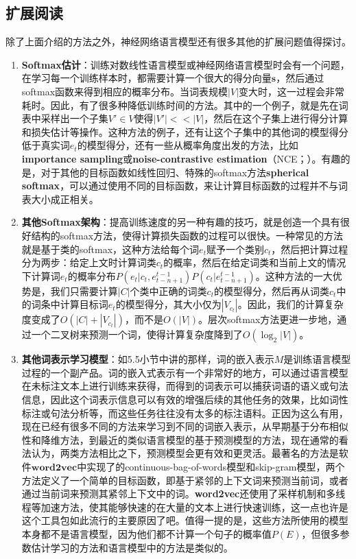 \documentclass[10pt,a4paper]{ctexart}
\begin{document}
\subsection{扩展阅读}
除了上面介绍的方法之外，神经网络语言模型还有很多其他的扩展问题值得探讨。
\begin{enumerate}
\item[] \textbf{Softmax估计}：训练对数线性语言模型或神经网络语言模型时会有一个问题，在学习每一个训练样本时，都需要计算一个很大的得分向量$\textbf{s}$，然后通过softmax函数来得到相应的概率分布。当词表规模$|V|$变大时，这一过程会非常耗时。因此，有了很多种降低训练时间的方法。其中的一个例子，就是先在词表中采样出一个子集$V' \in V$使得$|V'| << |V|$，然后在这个子集上进行得分计算和损失估计等操作。这种方法的例子，还有让这个子集中的其他词的模型得分低于真实词$e_t$的模型得分\cite{collobert2011natural}，还有一些从概率角度出发的方法，比如\textbf{importance sampling}\cite{bengio2008adaptive}或\textbf{noise-contrastive estimation}（NCE；\cite{mnih2012fast}）。有趣的是，对于其他的目标函数如线性回归、特殊的softmax方法\textbf{spherical softmax}，可以通过使用不同的目标函数，来让计算目标函数的过程并不与词表大小成正相关\cite{vincent2015efficient}。
\item[] \textbf{其他Softmax架构}：提高训练速度的另一种有趣的技巧，就是创造一个具有很好结构的softmax方法，使得计算损失函数的过程可以很快。一种常见的方法就是基于类的softmax\cite{goodman2001classes}，这种方法给每个词$e_t$赋予一个类别$c_t$，然后把计算过程分为两步：给定上文时计算词类$c_t$的概率，然后在给定词类和当前上文的情况下计算词$e_t$的概率分布$P(e_t|c_t,e_{t-n+1}^{t-1})P(c_t|e_{t-n+1}^{t-1})$。这种方法的一大优势是，我们只需要计算$|C|$个类中正确的词类$c_t$的模型得分，然后再从词类$c_t$中的词条中计算目标词$e_t$的模型得分，其大小仅为$|V_{c_t}|$。因此，我们的计算复杂度变成了$O(|C| + |V_{c_t}|)$，而不是$O(|V|)$。层次softmax方法\cite{mikolov2013distributed}更进一步地，通过一个二叉树来预测一个词，使得计算复杂度降到了$O(\log_2 |V|)$。
\item[] \textbf{其他词表示学习模型}：如5.5小节中讲的那样，词的嵌入表示$M$是训练语言模型过程的一个副产品。词的嵌入式表示有一个非常好的地方，可以通过语言模型在未标注文本上进行训练来获得，而得到的词表示可以捕获词语的语义或句法信息，因此这个词表示信息可以有效的增强后续的其他任务的效果，比如词性标注或句法分析等，而这些任务往往没有太多的标注语料\cite{turian2010word}。正因为这么有用，现在已经有很多不同的方法来学习到不同的词嵌入表示，从早期基于分布相似性和降维方法\cite{schutze1993word,turney2010frequency}，到最近的类似语言模型的基于预测模型的方法\cite{turian2010word,mikolov2013efficient}，现在通常的看法认为，两类方法相比之下，预测模型会更有效和更灵活\cite{baroni2014don}。最著名的方法是软件$\textbf{word2vec}$中实现了的continuous-bag-of-words模型和skip-gram模型，两个方法定义了一个简单的目标函数，即基于紧邻的上下文词来预测当前词，或者通过当前词来预测其紧邻上下文中的词。\textbf{word2vec}还使用了采样机制和多线程等加速方法，使其能够快速的在大量的文本上进行快速训练，这一点也许是这个工具包如此流行的主要原因了吧。值得一提的是，这些方法所使用的模型本身都不是语言模型，因为他们都不计算一个句子的概率值$P(E)$，但很多参数估计学习的方法和语言模型中的方法是类似的。
\end{enumerate}
\end{document}
